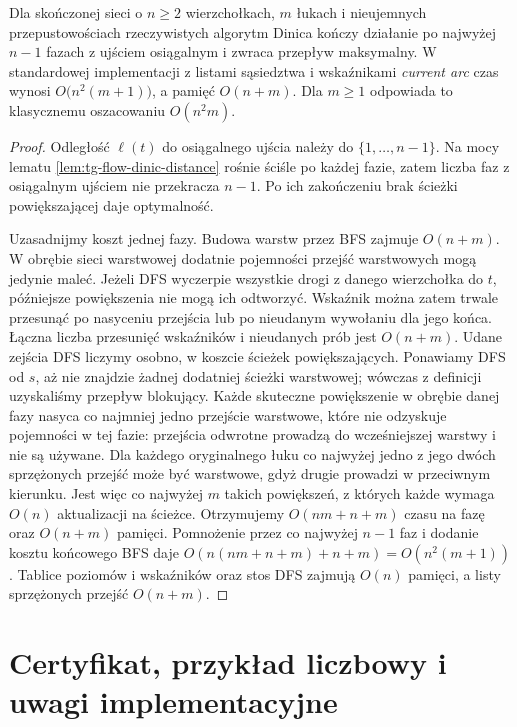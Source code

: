 \begin{twierdzenie}
\label{thm:tg-flow-dinic}
Dla skończonej sieci o $n\geq2$ wierzchołkach,
$m$ łukach i nieujemnych przepustowościach
rzeczywistych algorytm Dinica
kończy działanie po najwyżej $n-1$
fazach z ujściem osiągalnym
i zwraca przepływ maksymalny.
W standardowej implementacji
z listami sąsiedztwa i wskaźnikami
\emph{current arc} czas wynosi
$O\bigl(n^2(m+1)\bigr)$,
a pamięć $O(n+m)$.
Dla $m\geq1$ odpowiada to
klasycznemu oszacowaniu $O(n^2m)$.
\end{twierdzenie}
\begin{proof}
Odległość $\ell(t)$ do
osiągalnego ujścia należy
do $\{1,\ldots,n-1\}$.
Na mocy lematu
\ref{lem:tg-flow-dinic-distance}
rośnie ściśle po każdej fazie,
zatem liczba faz z osiągalnym
ujściem nie przekracza $n-1$.
Po ich zakończeniu brak ścieżki
powiększającej daje optymalność.

Uzasadnijmy koszt jednej fazy.
Budowa warstw przez BFS
zajmuje $O(n+m)$.
W obrębie sieci warstwowej dodatnie pojemności
przejść warstwowych mogą jedynie maleć.
Jeżeli DFS wyczerpie wszystkie drogi z danego
wierzchołka do $t$, późniejsze powiększenia nie
mogą ich odtworzyć. Wskaźnik można zatem trwale
przesunąć po nasyceniu przejścia lub po nieudanym
wywołaniu dla jego końca. Łączna liczba przesunięć
wskaźników i nieudanych prób jest $O(n+m)$.
Udane zejścia DFS liczymy osobno, w koszcie ścieżek
powiększających. Ponawiamy DFS od $s$, aż nie znajdzie
żadnej dodatniej ścieżki warstwowej; wówczas z definicji
uzyskaliśmy przepływ blokujący.
Każde skuteczne powiększenie
w obrębie danej fazy
nasyca co najmniej jedno
przejście warstwowe,
które nie odzyskuje
pojemności w tej fazie:
przejścia odwrotne
prowadzą do wcześniejszej
warstwy i nie są używane.
Dla każdego oryginalnego łuku co najwyżej jedno
z jego dwóch sprzężonych przejść może być warstwowe,
gdyż drugie prowadzi w przeciwnym kierunku.
Jest więc co najwyżej $m$ takich powiększeń,
z których każde wymaga
$O(n)$ aktualizacji
na ścieżce. Otrzymujemy
$O(nm+n+m)$ czasu
na fazę oraz
$O(n+m)$ pamięci.
Pomnożenie przez co najwyżej $n-1$ faz i dodanie
kosztu końcowego BFS daje
$O(n(nm+n+m)+n+m)=O(n^2(m+1))$.
Tablice poziomów i wskaźników oraz stos DFS
zajmują $O(n)$ pamięci, a listy sprzężonych
przejść $O(n+m)$.
\end{proof}

\section{Certyfikat, przykład liczbowy i uwagi implementacyjne}
\label{sec:tg-flow-example}

